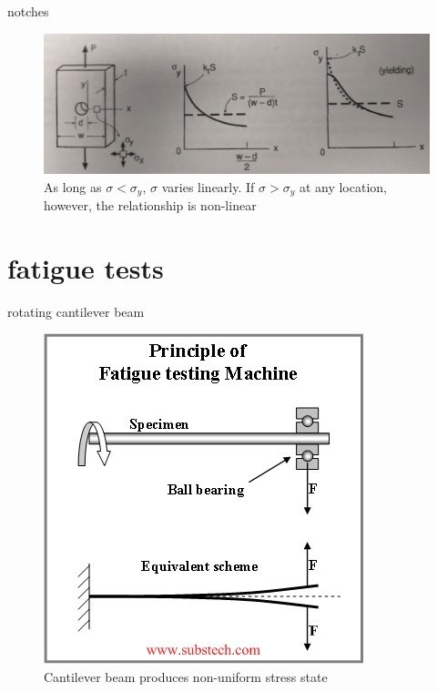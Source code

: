 \documentclass[10pt]{beamer}
\begin{document}
\begin{frame}{notches}
	\begin{figure}
	\centering
	\includegraphics[width=0.7\linewidth]{../Figures/p232-c}
	\caption{As long as $\sigma < \sigma_y$, $\sigma$ varies linearly. If $\sigma > \sigma_y$ at any location, however, the relationship is non-linear}
	\label{fig:p232-c}
	\end{figure}
\end{frame}

\section{fatigue tests}

\begin{frame}{rotating cantilever beam}
	\begin{figure}
	\centering
	\includegraphics[width=0.7\linewidth]{"../Figures/rotating_cantilever"}
	\caption{Cantilever beam produces non-uniform stress state}
	\label{fig:rotatingcantilever}
	\end{figure}
\end{frame}
\end{document}
